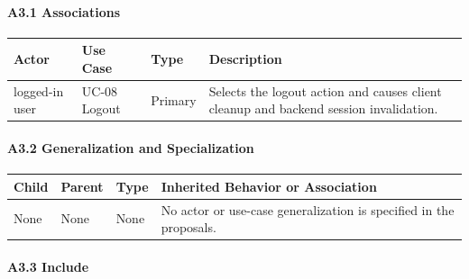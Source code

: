 \documentclass[12pt]{article}
\renewcommand{\baselinestretch}{1.5}
\begin{document}
\hypertarget{sec:a3-1-associations}{}
\paragraph*{A3.1 Associations}
\par\medskip

\begingroup
\small
\renewcommand{\baselinestretch}{1.0}\selectfont
\renewcommand{\arraystretch}{1.15}
\setlength{\tabcolsep}{6pt}
\begin{longtable}{|>{\raggedright\arraybackslash}p{}|>{\raggedright\arraybackslash}p{}|>{\raggedright\arraybackslash}p{}|>{\raggedright\arraybackslash}p{}|}
\hline
\textbf{Actor} & \textbf{Use Case} & \textbf{Type} & \textbf{Description} \\ \hline
\endhead
logged-in user & UC-08 Logout & Primary & Selects the logout action and causes client cleanup and backend session invalidation. \\ \hline
\end{longtable}
\endgroup
\par\medskip

\hypertarget{sec:a3-2-generalization-and-specialization}{}
\paragraph*{A3.2 Generalization and Specialization}
\par\medskip

\begingroup
\small
\renewcommand{\baselinestretch}{1.0}\selectfont
\renewcommand{\arraystretch}{1.15}
\setlength{\tabcolsep}{6pt}
\begin{longtable}{|>{\raggedright\arraybackslash}p{}|>{\raggedright\arraybackslash}p{}|>{\raggedright\arraybackslash}p{}|>{\raggedright\arraybackslash}p{}|}
\hline
\textbf{Child} & \textbf{Parent} & \textbf{Type} & \textbf{Inherited Behavior or Association} \\ \hline
\endhead
None & None & None & No actor or use-case generalization is specified in the proposals. \\ \hline
\end{longtable}
\endgroup
\par\medskip

\hypertarget{sec:a3-3-include}{}
\paragraph*{A3.3 Include}
\par\medskip
\end{document}
